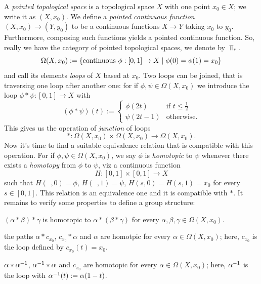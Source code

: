 \begin{example}
  A {\em pointed topological space} is a topological space \(X\) with
  one point \(x_0 \in X\); we write it as \((X, x_0)\). We define a {\em
    pointed continuous function} \((X, x_0) \to (Y, y_0)\) to be a
  continuous functions \(X \to Y\) taking \(x_0\) to \(y_0\). Furthermore,
  composing such functions yields a pointed continuous function. So,
  really we have the category of pointed topological spaces, we denote
  by \(\Top_\ast\).
  \[
    \Omega(X, x_0) := \left\{\text{continuous } \phi : [0,1] \to X \mid \phi(0) = \phi(1) =
      x_0\right\}
  \]
  and call its elements {\em loops} of \(X\) based at \(x_0\).  Two
  loops can be joined, that is traversing one loop after another one:
  for if \(\phi, \psi \in \Omega(X, x_0)\) we introduce the loop
  \(\phi \ast \psi : [0,1] \to X\) with
  \[
    (\phi \ast \psi) (t) :=
    \begin{cases}
      \phi(2t) & \text{if } t \le \frac12 \\
      \psi(2t-1) & \text{otherwise.}
    \end{cases}
  \]
  This gives us the operation of {\em junction} of loops
  \[
    \ast : \Omega(X, x_0) \times \Omega(X, x_0) \to \Omega(X, x_0) .
  \]
  Now it's time to find a suitable equivalence relation that is
  compatible with this operation. For if
  \(\phi, \psi \in \Omega(X, x_0)\), we say \(\phi\) is {\em homotopic} to
  \(\psi\) whenever there exists a {\em homotopy} from \(\phi\) to
  \(\psi\), viz a continuous function
  \[H : [0,1] \times [0,1] \to X\] such that
  \(H(\phantom{s}, 0) = \phi\), \(H(\phantom{s}, 1) = \psi\),
  \(H(s, 0) = H(s, 1) = x_0\) for every \(s \in [0, 1]\). This relation is
  an equivalence one and it is compatible with \(\ast\). It remains to
  verify some properties to define a group structure:
  \begin{tcbitem}
  \item \((\alpha \ast \beta) \ast \gamma\) is homotopic to
    \(\alpha \ast (\beta \ast \gamma)\) for every \(\alpha, \beta, \gamma \in \Omega(X, x_0)\).
  \item the paths \(\alpha \ast c_{x_0}\), \(c_{x_0} \ast \alpha\) and
    \(\alpha\) are homotpic for every \(\alpha \in \Omega(X, x_0)\); here,
    \(c_{x_0}\) is the loop defined by \(c_{x_0}(t) = x_0\).
  \item \(\alpha \ast \alpha^{-1}\), \(\alpha^{-1} \ast \alpha\) and
    \(c_{x_0}\) are homotopic for every \(\alpha \in \Omega(X, x_0)\); here,
    \(\alpha^{-1}\) is the loop with \(\alpha^{-1} (t) := \alpha (1-t)\).

\end{tcbitem}
\end{example}
